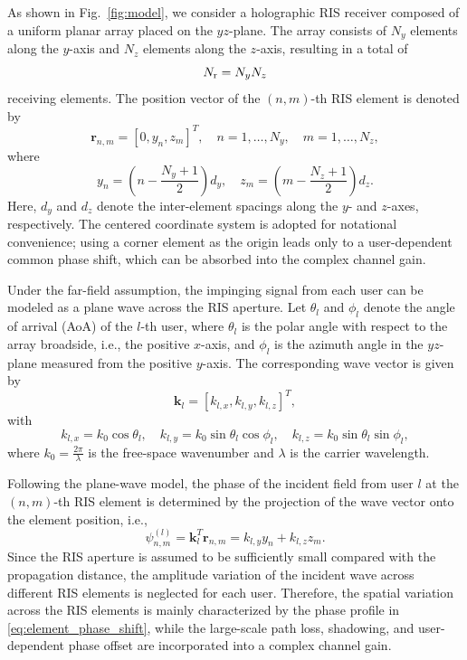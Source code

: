\documentclass[journal]{IEEEtran}
\begin{document}
As shown in Fig.~\ref{fig:model}, we consider a holographic RIS receiver composed of a uniform planar array placed on the $yz$-plane. 
The array consists of $N_y$ elements along the $y$-axis and $N_z$ elements along the $z$-axis, resulting in a total of 
\begin{equation}
N_{\rm r}=N_yN_z
\end{equation}
receiving elements. 
The position vector of the $(n,m)$-th RIS element is denoted by
\begin{equation}
\mathbf{r}_{n,m}
=
[0,y_n,z_m]^T,
\quad
n=1,\ldots,N_y,\quad m=1,\ldots,N_z,
\end{equation}
where
\begin{equation}
y_n=
\left(n-\frac{N_y+1}{2}\right)d_y,
\quad
z_m=
\left(m-\frac{N_z+1}{2}\right)d_z.
\end{equation}
Here, $d_y$ and $d_z$ denote the inter-element spacings along the $y$- and $z$-axes, respectively. 
The centered coordinate system is adopted for notational convenience; using a corner element as the origin leads only to a user-dependent common phase shift, which can be absorbed into the complex channel gain.

Under the far-field assumption, the impinging signal from each user can be modeled as a plane wave across the RIS aperture. 
Let $\theta_l$ and $\phi_l$ denote the angle of arrival (AoA) of the $l$-th user, where $\theta_l$ is the polar angle with respect to the array broadside, i.e., the positive $x$-axis, and $\phi_l$ is the azimuth angle in the $yz$-plane measured from the positive $y$-axis. 
The corresponding wave vector is given by
\begin{equation}
\mathbf{k}_l
=
[k_{l,x},k_{l,y},k_{l,z}]^T,
\end{equation}
with
\begin{equation}
k_{l,x}=k_0\cos\theta_l,\quad
k_{l,y}=k_0\sin\theta_l\cos\phi_l,\quad
k_{l,z}=k_0\sin\theta_l\sin\phi_l,
\end{equation}
where $k_0=\frac{2\pi}{\lambda}$ is the free-space wavenumber and $\lambda$ is the carrier wavelength.

Following the plane-wave model, the phase of the incident field from user $l$ at the $(n,m)$-th RIS element is determined by the projection of the wave vector onto the element position, i.e.,
\begin{equation}
\psi_{n,m}^{(l)}
=
\mathbf{k}_l^T\mathbf{r}_{n,m}
=
k_{l,y}y_n+k_{l,z}z_m.
\label{eq:element_phase_shift}
\end{equation}
Since the RIS aperture is assumed to be sufficiently small compared with the propagation distance, the amplitude variation of the incident wave across different RIS elements is neglected for each user. 
Therefore, the spatial variation across the RIS elements is mainly characterized by the phase profile in \eqref{eq:element_phase_shift}, while the large-scale path loss, shadowing, and user-dependent phase offset are incorporated into a complex channel gain.
\end{document}
